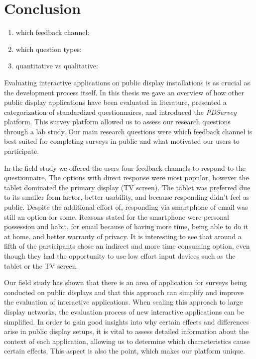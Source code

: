 \section{Conclusion}
\label{chapter:conclusion}


	\begin{enumerate}
	\item which feedback channel:
	\item which question types: 
	\item quantitative vs qualitative: 
	\end{enumerate}


	Evaluating interactive applications on public display installations is as crucial as the development process itself. In this thesis we gave an overview of how other public display applications have been evaluated in literature, presented a categorization of standardized questionnaires, and introduced the \textit{PDSurvey} platform. This survey platform allowed us to assess our research questions through a lab study. Our main research questions were which feedback channel is best suited for completing surveys in public and what motivated our users to participate. 

	In the field study we offered the users four feedback channels to respond to the questionnaire. The options with direct response were most popular, however the tablet dominated the primary display (TV screen). The tablet was preferred due to its smaller form factor, better usability, and because responding didn't feel as public. Despite the additional effort of, responding via smartphone of email was still an option for some. Reasons stated for the smartphone were personal possession and habit, for email because of having more time, being able to do it at home, and better warranty of privacy. It is interesting to see that around a fifth of the participants chose an indirect and more time consuming option, even though they had the opportunity to use low effort input devices such as the tablet or the TV screen.


	Our field study has shown that there is an area of application for surveys being conducted on public displays and that this approach can simplify and improve the evaluation of interactive applications. When scaling this approach to large display networks, the evaluation process of new interactive applications can be simplified. In order to gain good insights into why certain effects and differences arise in public display setups, it is vital to assess detailed information about the context of each application, allowing us to determine which characteristics cause certain effects. This aspect is also the point, which makes our platform unique. 

